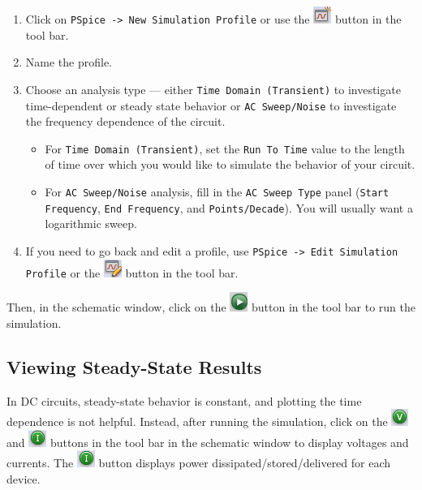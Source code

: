 \documentclass[11pt]{article}
\begin{document}
\begin{enumerate}
\item Click on \texttt{PSpice -> New Simulation Profile} or use the
  \includegraphics{OrCAD_NewSimProf.png} button in the tool bar.

\item Name the profile.

\item Choose an analysis type --- either \texttt{Time Domain
  (Transient)} to investigate time-dependent or steady state behavior
  or \texttt{AC Sweep/Noise} to investigate the frequency dependence
  of the circuit.
  \begin{itemize}
  \item For \texttt{Time Domain (Transient)}, set the \texttt{Run
    To Time} value to the length of time over which you would like to
    simulate the behavior of your circuit. 
    
  \item For \texttt{AC Sweep/Noise} analysis, fill in the \texttt{AC
    Sweep Type} panel (\texttt{Start Frequency}, \texttt{End
    Frequency}, and \texttt{Points/Decade}). You will usually want a
    logarithmic sweep.
  \end{itemize}

  \item If you need to go back and edit a profile, use \texttt{PSpice
    -> Edit Simulation Profile} or the
    \includegraphics{OrCAD_EditSimProf.png} button in the tool bar.
\end{enumerate}

Then, in the schematic window, click on the 
\includegraphics{OrCAD_RunSim.png} button in the tool bar to run the
simulation. 

\subsection{Viewing Steady-State Results}

In DC circuits, steady-state behavior is constant, and plotting the
time dependence is not helpful. Instead, after running the simulation,
click on the \includegraphics{OrCAD_ShowV.png} and
\includegraphics{OrCAD_ShowI.png} buttons in the tool bar in the 
schematic window to display voltages and currents. The
\includegraphics{OrCAD_ShowI.png} button displays power
dissipated/stored/delivered for each device.
\end{document}
